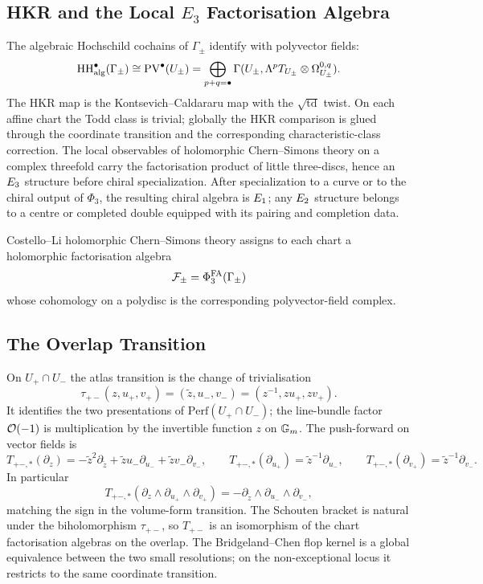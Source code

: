 \subsection*{HKR and the Local \texorpdfstring{$E_3$}{E3} Factorisation Algebra}

The algebraic Hochschild cochains of $\Gamma_\pm$ identify with
polyvector fields:
\[
  \mathrm{HH}^\bullet_{\mathrm{alg}}(\Gamma_\pm)
  \cong
  \mathrm{PV}^\bullet(U_\pm)
  =
  \bigoplus_{p+q=\bullet}
  \Gamma(U_\pm,\Lambda^pT_{U_\pm}\otimes\Omega_{U_\pm}^{0,q}).
\]
The HKR map is the Kontsevich--Caldararu map with the
$\sqrt{\mathrm{td}}$ twist. On each affine chart the Todd class is
trivial; globally the HKR comparison is glued through the coordinate
transition and the corresponding characteristic-class correction. The
local observables of holomorphic Chern--Simons theory on a complex
threefold carry the factorisation product of little three-discs, hence
an $E_3$ structure before chiral specialization. After
specialization to a curve or to the chiral output of $\Phi_3$, the
resulting chiral algebra is $E_1$; any $E_2$ structure belongs to a
centre or completed double equipped with its pairing and completion
data.

Costello--Li holomorphic Chern--Simons theory assigns to each chart a
holomorphic factorisation algebra
\[
  \mathcal{F}_\pm=\Phi^{\mathrm{FA}}_3(\Gamma_\pm)
\]
whose cohomology on a polydisc is the corresponding polyvector-field
complex.

\subsection*{The Overlap Transition}

On $U_+\cap U_-$ the atlas transition is the change of trivialisation
\[
  \tau_{+-}(z,u_+,v_+)=(\tilde z,u_-,v_-)
  =(z^{-1},zu_+,zv_+).
\]
It identifies the two presentations of $\mathrm{Perf}(U_+\cap U_-)$;
the line-bundle factor $\mathcal{O}(-1)$ is multiplication by the invertible
function $z$ on $\mathbb{G}_m$. The push-forward on vector fields is
\[
  T_{+-,*}(\partial_z)
  =
  -\tilde z^2\partial_{\tilde z}
  +\tilde z u_-\partial_{u_-}
  +\tilde z v_-\partial_{v_-},
  \qquad
  T_{+-,*}(\partial_{u_+})=\tilde z^{-1}\partial_{u_-},
  \qquad
  T_{+-,*}(\partial_{v_+})=\tilde z^{-1}\partial_{v_-}.
\]
In particular
\[
  T_{+-,*}(\partial_z\wedge\partial_{u_+}\wedge\partial_{v_+})
  =
  -\partial_{\tilde z}\wedge\partial_{u_-}\wedge\partial_{v_-},
\]
matching the sign in the volume-form transition. The Schouten bracket
is natural under the biholomorphism $\tau_{+-}$, so $T_{+-}$ is an
isomorphism of the chart factorisation algebras on the overlap. The
Bridgeland--Chen flop kernel is a global equivalence between the two
small resolutions; on the non-exceptional locus it restricts to the
same coordinate transition.

